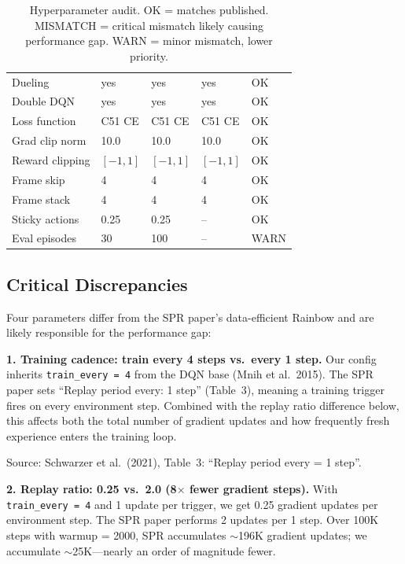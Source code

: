 \documentclass[11pt]{article}
\newcommand{\ok}{\textcolor{green!60!black}{OK}}
\newcommand{\bad}{\textcolor{red!70!black}{MISMATCH}}
\newcommand{\warn}{\textcolor{orange!80!black}{WARN}}
\begin{document}
\begin{table}[H]
\begin{tabular}{l l l l l}
Dueling             & yes            & yes               & yes            & \ok \\
Double DQN          & yes            & yes               & yes            & \ok \\
Loss function       & C51 CE         & C51 CE            & C51 CE         & \ok \\
Grad clip norm      & 10.0           & 10.0              & 10.0           & \ok \\
Reward clipping     & $[-1, 1]$      & $[-1, 1]$         & $[-1, 1]$      & \ok \\
Frame skip          & 4              & 4                 & 4              & \ok \\
Frame stack         & 4              & 4                 & 4              & \ok \\
Sticky actions      & 0.25           & 0.25              & --             & \ok \\
Eval episodes       & 30             & 100               & --             & \warn \\
\bottomrule
\end{tabular}
\caption{Hyperparameter audit. \ok{} = matches published.
\bad{} = critical mismatch likely causing performance gap.
\warn{} = minor mismatch, lower priority.}
\label{tab:audit}
\end{table}

\subsection{Critical Discrepancies}

Four parameters differ from the SPR paper's data-efficient Rainbow
and are likely responsible for the performance gap:

\medskip
\textbf{1. Training cadence: train every 4 steps vs.\ every 1 step.}
Our config inherits \texttt{train\_every = 4} from the DQN base
(Mnih et al.\ 2015). The SPR paper sets ``Replay period every: 1
step'' (Table~3), meaning a training trigger fires on every
environment step. Combined with the replay ratio difference below,
this affects both the total number of gradient updates and how
frequently fresh experience enters the training loop.

Source: Schwarzer et al.\ (2021), Table~3: ``Replay period every =
1 step''.

\medskip
\textbf{2. Replay ratio: 0.25 vs.\ 2.0 (8$\times$ fewer gradient
steps).} With \texttt{train\_every = 4} and 1 update per trigger, we
get 0.25 gradient updates per environment step. The SPR paper
performs 2 updates per 1 step. Over 100K steps with warmup = 2000,
SPR accumulates $\sim$196K gradient updates; we accumulate
$\sim$25K---nearly an order of magnitude fewer.
\end{document}
